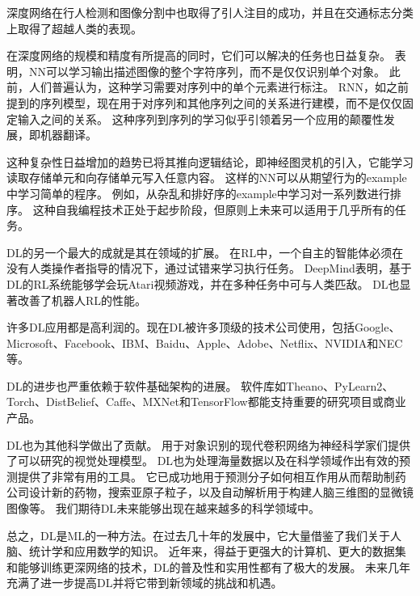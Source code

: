深度网络在行人检测和图像分割中也取得了引人注目的成功\citep{sermanet-cvpr-13,Farabet-et-al-2013,couprie-iclr-13}，并且在交通标志分类上取得了超越人类的表现\citep{Ciresan-et-al-2012}。

在深度网络的规模和精度有所提高的同时，它们可以解决的任务也日益复杂。
\citet{Goodfellow+et+al-ICLR2014a}表明，\gls{NN}可以学习输出描述图像的整个字符序列，而不是仅仅识别单个对象。
此前，人们普遍认为，这种学习需要对序列中的单个元素进行标注\citep{Gulcehre+Bengio-arxiv-2013}。
\gls{RNN}，如之前提到的序列模型，现在用于对序列和其他序列之间的关系进行建模，而不是仅仅固定输入之间的关系。
这种序列到序列的学习似乎引领着另一个应用的颠覆性发展，即机器翻译\citep{Sutskever-et-al-NIPS2014,Bahdanau-et-al-ICLR2015-small}。


这种复杂性日益增加的趋势已将其推向逻辑结论，即神经图灵机\citep{Graves-et-al-arxiv2014}的引入，它能学习读取存储单元和向存储单元写入任意内容。
这样的\gls{NN}可以从期望行为的\gls{example}中学习简单的程序。
例如，从杂乱和排好序的\gls{example}中学习对一系列数进行排序。
这种自我编程技术正处于起步阶段，但原则上未来可以适用于几乎所有的任务。


\gls{DL}的另一个最大的成就是其在领域的扩展。
在\gls{RL}中，一个自主的智能体必须在没有人类操作者指导的情况下，通过试错来学习执行任务。
DeepMind表明，基于\gls{DL}的\gls{RL}系统能够学会玩Atari视频游戏，并在多种任务中可与人类匹敌\citep{Mnih-et-al-2015}。
\gls{DL}也显著改善了机器人\gls{RL}的性能\citep{finn2015learning}。

许多\gls{DL}应用都是高利润的。现在\gls{DL}被许多顶级的技术公司使用，包括Google、Microsoft、Facebook、IBM、Baidu、Apple、Adobe、Netflix、NVIDIA和NEC等。

\gls{DL}的进步也严重依赖于软件基础架构的进展。
软件库如Theano\citep{bergstra+al:2010-scipy,Bastien-2012}、PyLearn2\citep{pylearn2_arxiv_2013}、Torch\citep{Torch-2011}、DistBelief\citep{Dean-et-al-NIPS2012}、Caffe\citep{Jia13caffe}、MXNet\citep{chen2015mxnet}和TensorFlow\citep{tensorflow}都能支持重要的研究项目或商业产品。

\gls{DL}也为其他科学做出了贡献。
用于对象识别的现代卷积网络为神经科学家们提供了可以研究的视觉处理模型\citep{dicarlo-tutorial-2013}。
\gls{DL}也为处理海量数据以及在科学领域作出有效的预测提供了非常有用的工具。
它已成功地用于预测分子如何相互作用从而帮助制药公司设计新的药物\citep{Dahl-et-al-arxiv2014}，搜索亚原子粒子\citep{baldi2014searching}，以及自动解析用于构建人脑三维图的显微镜图像\citep{knowlesdeep}等。
我们期待\gls{DL}未来能够出现在越来越多的科学领域中。


总之，\gls{DL}是\gls{ML}的一种方法。在过去几十年的发展中，它大量借鉴了我们关于人脑、统计学和应用数学的知识。
近年来，得益于更强大的计算机、更大的数据集和能够训练更深网络的技术，\gls{DL}的普及性和实用性都有了极大的发展。
未来几年充满了进一步提高\gls{DL}并将它带到新领域的挑战和机遇。

